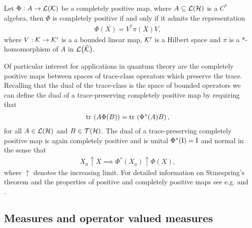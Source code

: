 \begin{thm}[Stinespring]\label{thm:stinespring}
  Let $\Phi:A\to\bops[\kcal]$ be a completely positive map, where $A\subseteq\bops[\hcal]$ is a $C^*$ algebra, then $\Phi$ is completely positive if and only if it admits the representation
  \begin{align}
    \Phi(X) = V^* \pi(X) V,
  \end{align}
  where $V:\mathcal{K}\to\mathcal{K}^\prime$ is a a bounded linear map, $\mathcal{K}^\prime$ is a Hilbert space and $\pi$ is a $*$-homomorphism of $A$ in $\bops[\tilde{\kcal}]$.
\end{thm}

Of particular interest for applications in quantum theory are the completely positive maps between spaces of trace-class operators which preserve the trace. Recalling that the dual of the trace-class is the space of bounded operators we can define the dual of a trace-preserving completely positive map by requiring that
\begin{align}
  \tr{A \Phi(B)} = \tr{\Phi^*(A) B},
\end{align}
for all $A\in\bops[\hcal]$ and $B\in\trops[\hcal]$. The dual of a trace-preserving completely positive map is again completely positive and is unital $\Phi^*(\operatorname{I}) = \operatorname{I}$ and normal in the sense that
\begin{align}
  X_a \uparrow X \implies \Phi^*(X_a) \uparrow \Phi(X),
\end{align}
where $\uparrow$ denotes the increasing limit. For detailed information on Stinespring's theorem and the properties of positive and completely positive maps see e.g. \cite{stormer1963} and \cite{stormer1974}.

\subsection{Measures and operator valued measures}


